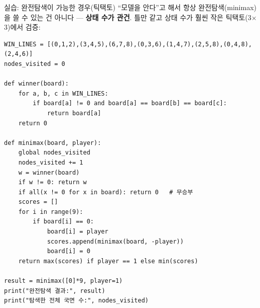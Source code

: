 \documentclass[aspectratio=169,11pt]{beamer}
\begin{document}

\begin{frame}[fragile]{실습: 완전탐색이 가능한 경우(틱택토)}
  ``모델을 안다''고 해서 항상 완전탐색(minimax)을 쓸 수 있는 건
  아니다 --- \textbf{상태 수가 관건}. 틀만 같고 상태 수가 훨씬
  작은 틱택토(3$\times$3)에서 검증:
\begin{lstlisting}
WIN_LINES = [(0,1,2),(3,4,5),(6,7,8),(0,3,6),(1,4,7),(2,5,8),(0,4,8),(2,4,6)]
nodes_visited = 0

def winner(board):
    for a, b, c in WIN_LINES:
        if board[a] != 0 and board[a] == board[b] == board[c]:
            return board[a]
    return 0

def minimax(board, player):
    global nodes_visited
    nodes_visited += 1
    w = winner(board)
    if w != 0: return w
    if all(x != 0 for x in board): return 0   # 무승부
    scores = []
    for i in range(9):
        if board[i] == 0:
            board[i] = player
            scores.append(minimax(board, -player))
            board[i] = 0
    return max(scores) if player == 1 else min(scores)

result = minimax([0]*9, player=1)
print("완전탐색 결과:", result)
print("탐색한 전체 국면 수:", nodes_visited)
\end{lstlisting}
\end{frame}
\end{document}
